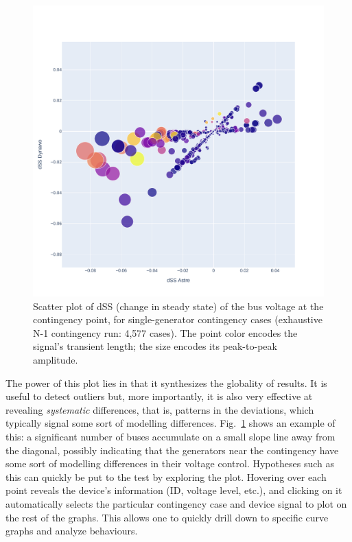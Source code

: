\documentclass[conference]{IEEEtran}
\begin{document}
\begin{figure}
  \centering
  \includegraphics[width=\columnwidth]{figs/Ubus_dSS_GENS_20210211-0930_moreT600}
  \caption{Scatter plot of dSS (change in steady state) of the bus
    voltage at the contingency point, for single-generator contingency
    cases (exhaustive N-1 contingency run: 4,577 cases). The point
    color encodes the signal's transient length; the size encodes its
    peak-to-peak amplitude.}
  \label{fig:bubbleplot1}
\end{figure}

The power of this plot lies in that it synthesizes the globality of results.  It
is useful to detect outliers but, more importantly, it is also very effective at
revealing \emph{systematic} differences, that is, patterns in the deviations,
which typically signal some sort of modelling
differences. Fig.~\ref{fig:bubbleplot1} shows an example of this: a significant
number of buses accumulate on a small slope line away from the diagonal,
possibly indicating that the generators near the contingency have some sort of
modelling differences in their voltage control. Hypotheses such as this can
quickly be put to the test by exploring the plot. Hovering over each point
reveals the device's information (ID, voltage level, etc.), and clicking on it
automatically selects the particular contingency case and device signal to plot
on the rest of the graphs. This allows one to quickly drill down to specific
curve graphs and analyze behaviours.
\end{document}
